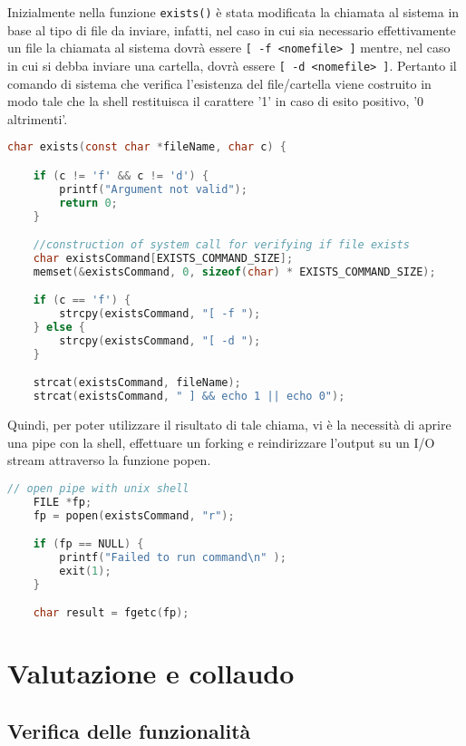 \documentclass[11pt,fleqn]{book} %
\begin{document}
Inizialmente nella funzione \texttt{exists()} è stata modificata la chiamata al sistema in base al tipo di file da inviare, infatti, nel caso in cui sia necessario effettivamente un file la chiamata al sistema dovrà essere \texttt{[ -f <nomefile> ]} mentre, nel caso in cui si debba inviare una cartella, dovrà essere \texttt{[ -d <nomefile> ]}.
Pertanto il comando di sistema che verifica l'esistenza del file/cartella viene costruito in modo tale che la shell restituisca il carattere '1' in caso di esito positivo, '0 altrimenti'.
\begin{lstlisting}[language=C]
char exists(const char *fileName, char c) {

	if (c != 'f' && c != 'd') {
		printf("Argument not valid");
		return 0;
	}

	//construction of system call for verifying if file exists
	char existsCommand[EXISTS_COMMAND_SIZE];
	memset(&existsCommand, 0, sizeof(char) * EXISTS_COMMAND_SIZE);

	if (c == 'f') {
		strcpy(existsCommand, "[ -f ");
	} else {
		strcpy(existsCommand, "[ -d ");
	}

	strcat(existsCommand, fileName);
	strcat(existsCommand, " ] && echo 1 || echo 0");
\end{lstlisting}

Quindi, per poter utilizzare il risultato di tale chiama, vi è la necessità di aprire una pipe con la shell, effettuare un forking e reindirizzare l'output su un I/O stream attraverso la funzione popen.

\begin{lstlisting}[language=C]
	// open pipe with unix shell
	FILE *fp;
	fp = popen(existsCommand, "r");

	if (fp == NULL) {
    	printf("Failed to run command\n" );
    	exit(1);
  	}

  	char result = fgetc(fp);
\end{lstlisting}



\chapter{Valutazione e collaudo}

\section{Verifica delle funzionalità}
\end{document}
